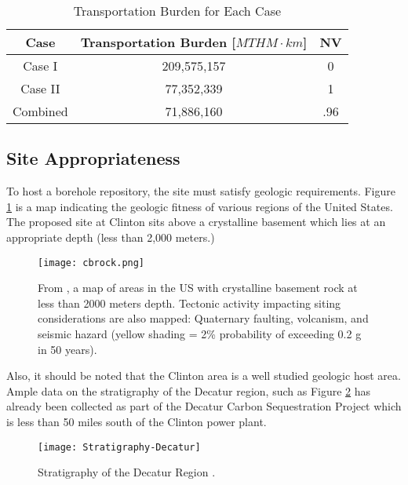 \begin{table}[h]
	\centering
        \caption {Transportation Burden for Each Case}
		\begin{tabular}{|c|c|c|}
			\hline
			Case & Transportation Burden [$MTHM\cdot km$] & NV\\
			\hline
			Case I & 209,575,157  & 0\\
			Case II & 77,352,339 & 1 \\
			Combined & 71,886,160 & .96\\ 
                        \hline
                \end{tabular}
\end{table}
  

 \subsection{Site Appropriateness} 

  To host a borehole repository, the site must satisfy geologic requirements. 
  Figure \ref{fig:cbrock} is a map indicating the geologic fitness of various 
  regions of the United States. The proposed site at Clinton sits above 
  a crystalline basement which lies at an appropriate depth (less than 2,000 
  meters.)

\begin{figure}[!h] 
  \centering
  \texttt{[image: cbrock.png]}	
        \caption{From \cite{perry_gis_2015}, a map of areas in the US with 
        crystalline basement rock at less than 2000 meters depth. Tectonic 
        activity impacting siting considerations are also mapped:  Quaternary 
        faulting, volcanism, and seismic hazard (yellow shading = 2\% 
        probability of exceeding 0.2 g in 50 years).}
  \label{fig:cbrock}
\end{figure}

    
  
  Also, it should be noted that the Clinton area is a well studied geologic 
  host area. Ample data on the stratigraphy of the Decatur region, such as  
  Figure \ref{fig:Stratigraphy} has already been collected as part of the 
  Decatur Carbon Sequestration Project which is less than 50 miles south of the 
  Clinton power plant.
 
\begin{figure}[!h] 
  \centering
  \texttt{[image: Stratigraphy-Decatur]}	
  \caption{Stratigraphy of the Decatur Region
  \cite{mcdonald_illinois_2012}.}
 \label{fig:Stratigraphy}
  	
 
\end{figure}
  
